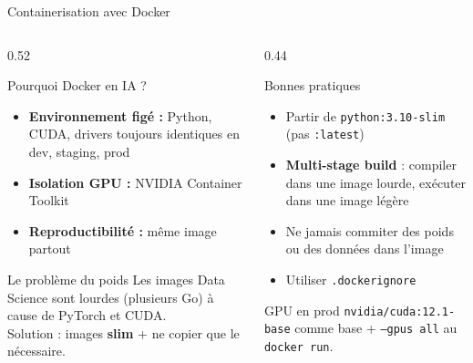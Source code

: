 \documentclass[aspectratio=169, 10pt]{beamer}
\begin{document}
\begin{frame}{Containerisation avec Docker}
  \begin{columns}[T]
    \begin{column}{0.52\textwidth}
      \begin{block}{Pourquoi Docker en IA ?}
        \begin{itemize}
          \item \textbf{Environnement figé :} Python, CUDA, drivers
                toujours identiques en dev, staging, prod
          \item \textbf{Isolation GPU :} NVIDIA Container Toolkit
          \item \textbf{Reproductibilité :} même image partout
        \end{itemize}
      \end{block}
      \smallskip
      \begin{alertblock}{Le problème du poids}
        Les images Data Science sont lourdes (plusieurs Go) à
        cause de PyTorch et CUDA.\\[2pt]
        Solution : images \textbf{slim} + ne copier que le
        nécessaire.
      \end{alertblock}
    \end{column}
    \begin{column}{0.44\textwidth}
      \begin{exampleblock}{Bonnes pratiques}
        \begin{itemize}
          \item Partir de \texttt{python:3.10-slim}
                (pas \texttt{:latest})
          \item \textbf{Multi-stage build} : compiler dans une
                image lourde, exécuter dans une image légère
          \item Ne jamais commiter des poids ou
                des données dans l'image
          \item Utiliser \texttt{.dockerignore}
        \end{itemize}
      \end{exampleblock}
      \vspace{2pt}
      \begin{block}{GPU en prod}
        \texttt{nvidia/cuda:12.1-base} comme base
        + \texttt{--gpus all} au \texttt{docker run}.
      \end{block}
    \end{column}
  \end{columns}
\end{frame}
\end{document}
